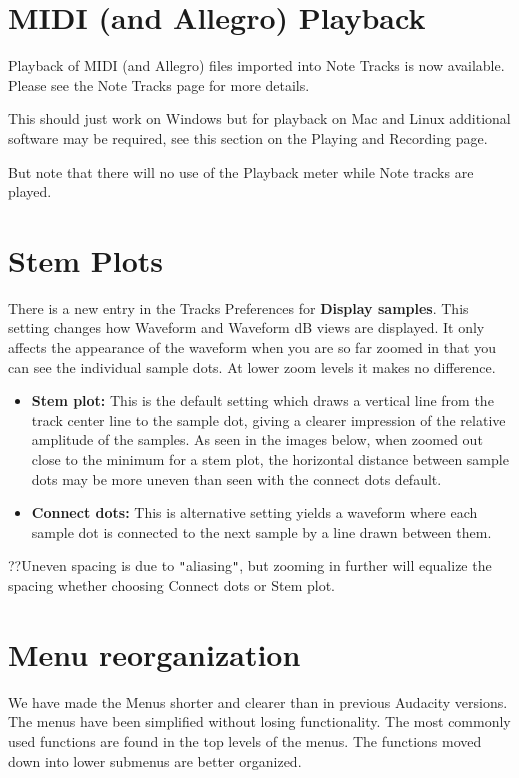 \section{MIDI (and Allegro) Playback}


Playback of MIDI (and Allegro) files imported into Note Tracks is now available.  Please see the Note Tracks page for more details.

This should just work on Windows but for playback on Mac and Linux additional software may be required, see this section on the Playing and Recording page.

But note that there will no use of the Playback meter while Note tracks are played. 

\section{Stem Plots}


There is a new entry in the Tracks Preferences for \textbf{Display samples}.  This setting changes how Waveform and Waveform dB views are displayed.  It only affects the appearance of the waveform when you are so far zoomed in that you can see the individual sample dots.  At lower zoom levels it makes no difference.  
\begin{itemize}
\item \textbf{Stem plot:} This is the default setting which draws a vertical line from the track center line to the sample dot, giving a clearer impression of the relative amplitude of the samples. As seen in the images below, when zoomed out close to the minimum for a stem plot, the horizontal distance between sample dots may be more uneven than seen with the connect dots default.   
\item \textbf{Connect dots:} This is alternative setting yields a waveform where each sample dot is connected to the next sample by a line drawn between them.  
\end{itemize}
??Uneven spacing is due to \texttt{{}"{}}aliasing\texttt{{}"{}}, but zooming in further will equalize the spacing whether choosing Connect dots or Stem plot.


\section{Menu reorganization}


We have made the Menus shorter and clearer than in previous Audacity versions. The menus have been simplified without losing functionality. The most commonly used functions are found in the top levels of the menus. The functions moved down into lower submenus are better organized.

